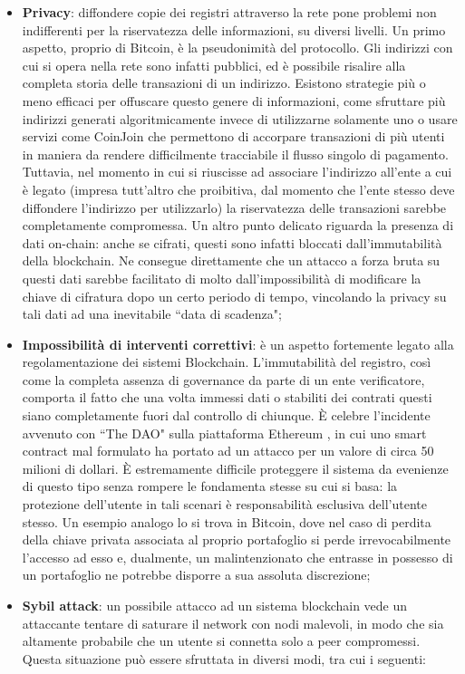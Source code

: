 \begin{itemize}
				\item \textbf{Privacy}: diffondere copie dei registri attraverso la rete pone problemi non indifferenti per la riservatezza delle informazioni, su diversi livelli. Un primo aspetto, proprio di Bitcoin, è la pseudonimità del protocollo. Gli indirizzi con cui si opera nella rete sono infatti pubblici, ed è possibile risalire alla completa storia delle transazioni di un indirizzo. Esistono strategie più o meno efficaci per offuscare questo genere di informazioni, come sfruttare più indirizzi generati algoritmicamente invece di utilizzarne solamente uno o usare servizi come CoinJoin che permettono di accorpare transazioni di più utenti in maniera da rendere difficilmente tracciabile il flusso singolo di pagamento. Tuttavia, nel momento in cui si riuscisse ad associare l'indirizzo all'ente a cui è legato (impresa tutt'altro che proibitiva, dal momento che l'ente stesso deve diffondere l'indirizzo per utilizzarlo) la riservatezza delle transazioni sarebbe completamente compromessa. Un altro punto delicato riguarda la presenza di dati on-chain: anche se cifrati, questi sono infatti bloccati dall'immutabilità della blockchain. Ne consegue direttamente che un attacco a forza bruta su questi dati sarebbe facilitato di molto dall'impossibilità di modificare la chiave di cifratura dopo un certo periodo di tempo, vincolando la privacy su tali dati ad una inevitabile ``data di scadenza"; 
				\item \textbf{Impossibilità di interventi correttivi}: è un aspetto fortemente legato alla regolamentazione dei sistemi Blockchain. L'immutabilità del registro, così come la completa assenza di governance da parte di un ente verificatore, comporta il fatto che una volta immessi dati o stabiliti dei contrati questi siano completamente fuori dal controllo di chiunque. È celebre l'incidente avvenuto con ``The DAO" sulla piattaforma Ethereum \cite{theDAO}, in cui uno smart contract mal formulato ha portato ad un attacco per un valore di circa 50 milioni di dollari. È estremamente difficile proteggere il sistema da evenienze di questo tipo senza rompere le fondamenta stesse su cui si basa: la protezione dell'utente in tali scenari è responsabilità esclusiva dell'utente stesso. Un esempio analogo lo si trova in Bitcoin, dove nel caso di perdita della chiave privata associata al proprio portafoglio si perde irrevocabilmente l'accesso ad esso e, dualmente, un malintenzionato che entrasse in possesso di un portafoglio ne potrebbe disporre a sua assoluta discrezione;
				\item \textbf{Sybil attack}: un possibile attacco ad un sistema blockchain vede un attaccante tentare di saturare il network con nodi malevoli, in modo che sia altamente probabile che un utente si connetta solo a peer compromessi. Questa situazione può essere sfruttata in diversi modi, tra cui i seguenti:

\end{itemize}
